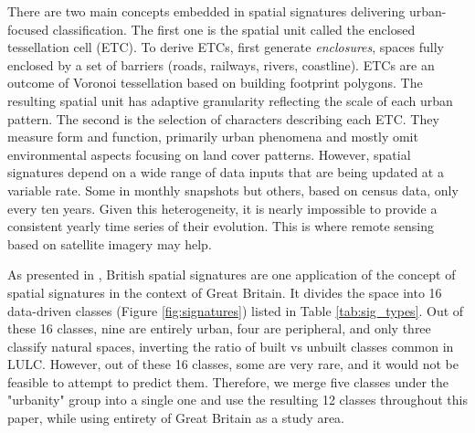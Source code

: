 There are two main concepts embedded in spatial signatures delivering urban-focused
classification. The first one is the spatial unit called the enclosed tessellation cell
(ETC). To derive ETCs, \cite{dab_mf_2021a} first generate \textit{enclosures}, spaces fully enclosed by
a set of barriers (roads, railways, rivers, coastline). ETCs are an outcome of
Voronoi tessellation based on building footprint polygons. The resulting spatial unit
has adaptive granularity reflecting the scale of each urban pattern. The
second is the selection of characters describing each ETC. They measure form and function,
primarily urban phenomena and mostly omit environmental aspects focusing on land
cover patterns. However, spatial signatures depend on a wide range of data inputs that
are being updated at a variable rate. Some in monthly snapshots but others,
based on census data, only every ten years. Given this heterogeneity,
it is nearly impossible to provide a consistent yearly time series of their evolution.
This is where remote sensing based on satellite imagery may help.


As presented in \cite{fleischmann2022geographical}, British spatial signatures are one
application of the concept of spatial signatures in
the context of Great Britain. It divides the space into 16 data-driven classes
(Figure \ref{fig:signatures}) listed in Table \ref{tab:sig_types}. Out of these 16
classes, nine are entirely urban, four are peripheral, and only three classify natural spaces,
inverting the ratio of built vs unbuilt classes common in LULC. However, out
of these 16 classes, some are very rare, and it would not be feasible to attempt to
predict them. Therefore, we merge five classes under the "urbanity" group into a
single one and use the resulting 12 classes throughout this paper, while using entirety
of Great Britain as a study area.


